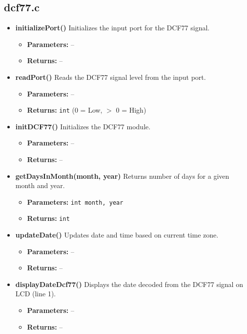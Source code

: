 \documentclass[a4paper,12pt]{article}
\begin{document}
\subsection{dcf77.c}
\begin{itemize}
    \item \textbf{initializePort()}  
    Initializes the input port for the DCF77 signal.  
    \begin{itemize}
        \item[] \textbf{Parameters:} --  
        \item[] \textbf{Returns:} --
    \end{itemize}

    \item \textbf{readPort()}  
    Reads the DCF77 signal level from the input port.  
    \begin{itemize}
        \item[] \textbf{Parameters:} --  
        \item[] \textbf{Returns:} \texttt{int} (0 = Low, $>$ 0 = High)
    \end{itemize}

    \item \textbf{initDCF77()}  
    Initializes the DCF77 module.  
    \begin{itemize}
        \item[] \textbf{Parameters:} --  
        \item[] \textbf{Returns:} --
    \end{itemize}

    \item \textbf{getDaysInMonth(month, year)}  
    Returns number of days for a given month and year.  
    \begin{itemize}
        \item[] \textbf{Parameters:} \texttt{int month, year}  
        \item[] \textbf{Returns:} \texttt{int}
    \end{itemize}

    \item \textbf{updateDate()}  
    Updates date and time based on current time zone.  
    \begin{itemize}
        \item[] \textbf{Parameters:} --  
        \item[] \textbf{Returns:} --
    \end{itemize}

    \item \textbf{displayDateDcf77()}  
    Displays the date decoded from the DCF77 signal on LCD (line 1).  
    \begin{itemize}
        \item[] \textbf{Parameters:} --  
        \item[] \textbf{Returns:} --
    \end{itemize}


\end{itemize}
\end{document}
